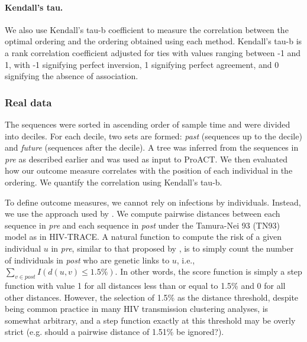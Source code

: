 \documentclass[a4paper,11pt]{article}
\newcommand{\authorcite}[1]{\citeauthor{#1}\supercite{#1}}
\begin{document}
\paragraph{Kendall's tau.} We also use Kendall's tau-b coefficient to measure the correlation between the optimal ordering and the ordering obtained using each method. 
Kendall's tau-b is a rank correlation coefficient adjusted for ties with values ranging between -1 and 1, with -1 signifying perfect inversion, 1 signifying perfect agreement, and 0 signifying the absence of association.\supercite{Kendall1938}


\subsubsection{Real data}


 


The sequences were sorted in ascending order of sample time and were divided into deciles.
For each decile,
two sets are formed: \textit{past} (sequences up to the decile) and \textit{future} (sequences after the decile). A  tree was inferred from the sequences in \textit{pre} as described earlier and was used as input to ProACT.
We then evaluated how our  outcome measure correlates with the position of each individual in the ordering. 
We quantify the correlation using Kendall's tau-b.

To define outcome measures, we cannot rely on infections by individuals. Instead, we use the approach used by \authorcite{Wertheim2018}. 
We compute pairwise distances  between each sequence in \textit{pre} and each sequence in \textit{post} under the Tamura-Nei 93 (TN93) model \supercite{Tamura1993} 
as in HIV-TRACE.\supercite{Pond2018}
A natural function to compute the risk of a given individual $u$ in \textit{pre},
similar to that proposed by \authorcite{Wertheim2018},
is to simply count the number of individuals in \textit{post} who are genetic links to $u$, i.e., $\sum_{v\in post}{I\left(d(u,v)\le1.5\%\right)}$.
In other words,
the score function is simply a step function with value 1 for all distances less than or equal to 1.5\% and 0 for all other distances.
However,
the selection of 1.5\% as the distance threshold,
despite being common practice in many HIV transmission clustering analyses,
is somewhat arbitrary,
and a step function exactly at this threshold may be overly strict
(e.g. should a pairwise distance of 1.51\% be ignored?).
\end{document}
